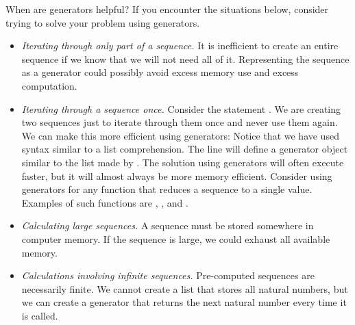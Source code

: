 When are generators helpful? 
If you encounter the situations below, consider trying to solve 
your problem using generators.
\begin{itemize}
\item \emph{Iterating through only part of a sequence.}
It is inefficient to create an entire sequence if we know that we will not need all of it.
Representing the sequence as a generator could possibly avoid excess memory use and excess computation.
\item \emph{Iterating through a sequence once.} Consider the statement 
.
We are creating two sequences just to iterate through them once and never use them again.
We can make this more efficient using generators:
Notice that we have used syntax similar to a list comprehension.
The line  will define a generator object similar to the list made by \li{[i for i in xrange(1000) if i\%2 == 0]}.
The solution using generators will often execute faster, but it will almost always be more memory efficient.  Consider using generators for any function that reduces a sequence to a single value.  Examples of such functions are , , and .
\item \emph{Calculating large sequences.}  A sequence must be stored somewhere in computer memory.
If the sequence is large, we could exhaust all available memory.
\item \emph{Calculations involving infinite sequences.}  Pre-computed sequences are necessarily finite.  We cannot create a list that stores all natural numbers, but we can create a generator that returns the next natural number every time it is called.
\end{itemize}

